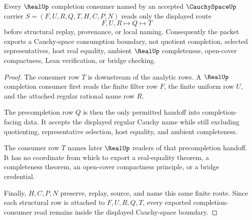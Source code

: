 \begin{theorem}
\label{thm:cauchyspace-real-completion-consumer}
Every $\RealUp$ completion consumer named by an accepted $\CauchySpaceUp$ carrier $S=(F,U,R,Q,T,H,C,P,N)$ reads only the displayed route
$$
F,U,R \longmapsto Q \longmapsto T
$$
before structural replay, provenance, or local naming. Consequently the packet exports a Cauchy-space consumption boundary, not quotient completion, selected representatives, host real equality, ambient $\RealUp$ completeness, open-cover compactness, Lean verification, or bridge checking.
\end{theorem}
\begin{proof}
The consumer row $T$ is downstream of the analytic rows. A $\RealUp$ completion consumer first reads the finite filter row $F$, the finite uniform row $U$, and the attached regular rational name row $R$.

The precompletion row $Q$ is then the only permitted handoff into completion-facing data. It accepts the displayed regular Cauchy name while still excluding quotienting, representative selection, host equality, and ambient completeness.

The consumer row $T$ names later $\RealUp$ readers of that precompletion handoff. It has no coordinate from which to export a real-equality theorem, a completeness theorem, an open-cover compactness principle, or a bridge credential.

Finally, $H,C,P,N$ preserve, replay, source, and name this same finite route. Since each structural row is attached to $F,U,R,Q,T$, every exported completion-consumer read remains inside the displayed Cauchy-space boundary.
\end{proof}

